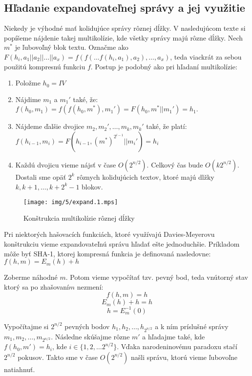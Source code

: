 \subsection{Hľadanie expandovateľnej správy a jej využitie}

Niekedy je výhodné mať kolidujúce správy rôznej dĺžky. 
V nasledujúcom texte si popíšeme nájdenie takej multikolízie,
kde všetky správy majú rôzne dĺžky. Nech $m^*$ je ľubovoľný
blok textu. 
Označme ako $F(h_i, a_1||a_2||\dots||a_x) = f(f(\dots f(h_i, a_1), a_2), \dots, a_x)$,
teda viackrát za sebou použitú kompresnú funkciu $f$.
Postup je podobný ako pri hľadaní multikolízie:
\begin{enumerate}
\itemsep -1.2mm
\item Položme $h_0 = IV$
\item Nájdime $m_1$ a $m_1'$ také, že: $f(h_0, m_1) = f(f(h_0, m^*), m_1') = F(h_0, m^*||m_1') = h_1$. 
\item Nájdeme ďalšie dvojice $m_2, m_2', \dots, m_k, m_k'$ také, že platí:
$f(h_{i-1}, m_i) = F(h_{i-1}, (m^*)^{2^{i-1}}||m_i') = h_i$
\item Každú dvojicu vieme nájsť v čase $O(2^{n/2})$. Celkový čas bude $O(k 2^{n/2})$.
Dostali sme opäť $2^k$ rôznych kolidujúcich textov, ktoré majú dlžky $k, k+1, \dots, k+2^k-1$ blokov.
\end{enumerate}

\begin{figure}[h!]
    \centering
    \texttt{[image: img/5/expand.1.mps]}
    \caption{Konštrukcia multikolízie rôznej dĺžky}
    \label{fig:expand1}
\end{figure}


Pri niektorých hašovacích funkciách, ktoré využívajú
Davies-Meyerovu konštrukciu vieme expandovateľnú správu hľadať
ešte jednoduchšie. Príkladom môže byť SHA-1, ktorej kompresná funkcia
je definovaná nasledovne:
$f(h, m) = E_m(h)+h$

Zoberme náhodné $m$. Potom vieme vypočítať tzv. pevný bod, teda vnútorný
stav ktorý sa po \clqq zhašovaní\crqq $m$ nezmení:
$$f(h,m) = h$$
$$E_m(h) + h= h$$
$$h = E_m^{-1}(0)$$

Vypočítajme si $2^{n/2}$ pevných bodov $h_1, h_2, \dots, h_{2^{n/2}}$ a k ním príslušné správy
$m_1, m_2, \dots, m_{2^{n/2}}$. 
Následne skúšajme rôzne $m'$ a hľadajme také, kde $f(h_0, m') = h_i$, kde $i \in \{1, 2, \dots 2^{n/2}\}$.
Vďaka narodeninovému paradoxu stačí $2^{n/2}$ pokusov. Takto sme v čase $O(2^{n/2})$ našli správu, ktorú
vieme ľubovoľne natiahnuť.

